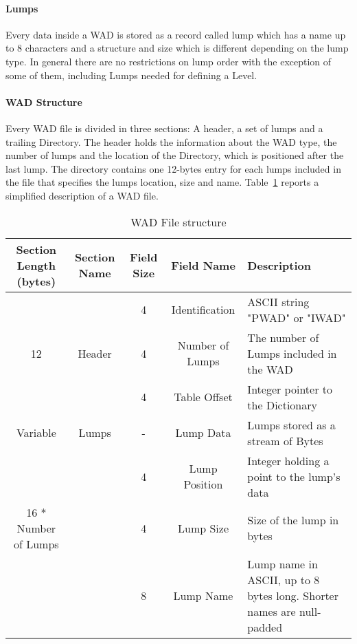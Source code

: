 \paragraph{Lumps} Every data inside a \gls{WAD} is stored as a record called \gls{lump} which has a name up to 8 characters and a structure and size which is different depending on the lump type. In general there are no restrictions on lump order with the exception of some of them, including Lumps needed for defining a Level.

\paragraph{WAD Structure} Every \gls{WAD} file is divided in three sections: A header, a set of \glspl{lump} and a trailing Directory. The header holds the information about the WAD type, the number of \glspl{lump} and the location of the Directory, which is positioned after the last \gls{lump}. The directory contains one 12-bytes entry for each \glspl{lump} included in the file that specifies the \glspl{lump} location, size and name. Table~\ref{tab:WADStructure} reports a simplified description of a \gls{WAD} file.



\begin{table}[b]
	\centering
	\begin{tabularx}{\textwidth}{| c | c | c | c | X | }
		\hline
		Section Length (bytes) & Section Name & Field Size & Field Name & Description \\
		\hline
		   &   & 4 & Identification & ASCII string "PWAD" or "IWAD" \\ \cline{3-5}
		12 &     Header			  & 4 & Number of Lumps & The number of Lumps included in the WAD \\  \cline{3-5}
		&   						  & 4 & Table Offset & Integer pointer to the Dictionary \\ \cline{3-5}
		\hline
		Variable& Lumps & - & Lump Data & Lumps stored as a stream of Bytes \\
		\hline
		&                              & 4 & Lump Position & Integer holding a point to the lump's data \\ \cline{3-5}
		16 * Number of Lumps  & \multirow{3}{*}{}{Directory} & 4 & Lump Size & Size of the lump in bytes \\ \cline{3-5}
		&                              & 8 & Lump Name & Lump name in ASCII, up to 8 bytes long. Shorter names are null-padded \\ \cline{3-5}
		\hline
	\end{tabularx}
\caption{WAD File structure}
\label{tab:WADStructure}
\end{table}

